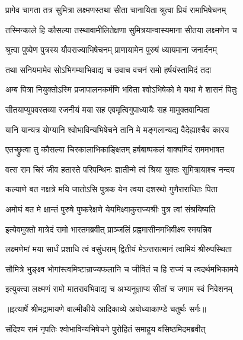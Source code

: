 \twolineshloka
{प्रागेव चागता तत्र सुमित्रा लक्ष्मणस्तथा}
{सीता चानायिता श्रुत्वा प्रियं रामाभिषेचनम्} %

\twolineshloka
{तस्मिन्काले हि कौसल्या तस्थावामीलितेक्षणा}
{सुमित्रयान्वास्यमाना सीतया लक्ष्मणेन च} %

\twolineshloka
{श्रुत्वा पुष्येण पुत्रस्य यौवराज्याभिषेचनम्}
{प्राणायामेन पुरुषं ध्यायमाना जनार्दनम्} %

\twolineshloka
{तथा सनियमामेव सोऽभिगम्याभिवाद्य च}
{उवाच वचनं रामो हर्षयंस्तामिदं तदा} %

\twolineshloka
{अम्ब पित्रा नियुक्तोऽस्मि प्रजापालनकर्मणि}
{भविता श्वोऽभिषेको मे यथा मे शासनं पितुः} %

\twolineshloka
{सीतयाप्युपवस्तव्या रजनीयं मया सह}
{एवमृत्विगुपाध्यायैः सह मामुक्तवान्पिता} %

\twolineshloka
{यानि यान्यत्र योग्यानि श्वोभाविन्यभिषेचने}
{तानि मे मङ्गलान्यद्य वैदेह्याश्चैव कारय} %

\twolineshloka
{एतच्छ्रुत्वा तु कौसल्या चिरकालाभिकाङ्क्षितम्}
{हर्षबाष्पकलं वाक्यमिदं राममभाषत} %

\twolineshloka
{वत्स राम चिरं जीव हतास्ते परिपन्थिनः}
{ज्ञातीन्मे त्वं श्रिया युक्तः सुमित्रायाश्च नन्दय} %

\twolineshloka
{कल्याणे बत नक्षत्रे मयि जातोऽसि पुत्रक}
{येन त्वया दशरथो गुणैराराधितः पिता} %

\twolineshloka
{अमोघं बत मे क्षान्तं पुरुषे पुष्करेक्षणे}
{येयमिक्ष्वाकुराज्यश्रीः पुत्र त्वां संश्रयिष्यति} %

\twolineshloka
{इत्येवमुक्तो मात्रेदं रामो भारतमब्रवीत्}
{प्राञ्जलिं प्रह्वमासीनमभिवीक्ष्य स्मयन्निव} %

\twolineshloka
{लक्ष्मणेमां मया सार्धं प्रशाधि त्वं वसुंधराम्}
{द्वितीयं मेऽन्तरात्मानं त्वामियं श्रीरुपस्थिता} %

\twolineshloka
{सौमित्रे भुङ्क्ष्व भोगांस्त्वमिष्टान्राज्यफलानि च}
{जीवितं च हि राज्यं च त्वदर्थमभिकामये} %

\twolineshloka
{इत्युक्त्वा लक्ष्मणं रामो मातरावभिवाद्य च}
{अभ्यनुज्ञाप्य सीतां च जगाम स्वं निवेशनम्} %


{॥इत्यार्षे श्रीमद्रामायणे वाल्मीकीये आदिकाव्ये अयोध्याकाण्डे चतुर्थः सर्गः॥}


\twolineshloka
{संदिश्य रामं नृपतिः श्वोभाविन्यभिषेचने}
{पुरोहितं समाहूय वसिष्ठमिदमब्रवीत्} %

